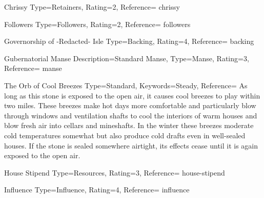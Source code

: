 ﻿


\begin{Merit}{Chrissy}{%
    Type=Retainers,
    Rating=2,
    Reference=\cite*[p.~164]{ex3}
}{chrissy}
    \TBW
\end{Merit}


\begin{Merit}{Followers}{%
    Type=Followers,
    Rating=2,
    Reference=\cite*[p.~161]{ex3}
}{followers}
    \TBW
\end{Merit}


\begin{Merit}{Governorship of -Redacted- Isle}{%
    Type=Backing,
    Rating=4,
    Reference=\cite*[p.~159]{ex3}
}{backing}
    \TBW
\end{Merit}


\begin{Merit}{Gubernatorial Manse}{%
    Description={Standard Manse},
    Type=Manse,
    Rating=3,
    Reference=\cite*[p.~163]{ex3}
}{manse}
    \TBW

    \begin{Hearthstone}{The Orb of Cool Breezes}{%
        Type=Standard,
        Keywords=Steady,
        Reference=\cite*[p.~604]{ex3}
    }
        As long as this stone is exposed to the open air, it causes cool
        breezes to play within two miles. These breezes make hot days more
        comfortable and particularly blow through windows and ventilation
        shafts to cool the interiors of warm houses and blow fresh air into
        cellars and mineshafts. In the winter these breezes moderate cold
        temperatures somewhat but also produce cold drafts even in
        well-sealed houses. If the stone is sealed somewhere airtight, its
        effects cease until it is again exposed to the open air.
    \end{Hearthstone}
\end{Merit}


\DocumentColumnBreak
\begin{Merit}{House Stipend}{%
    Type=Resources,
    Rating=3,
    Reference=\cite*[p.~164]{ex3}
}{house-stipend}
    \TBW
\end{Merit}


\begin{Merit}{Influence}{%
    Type=Influence,
    Rating=4,
    Reference=\cite*[p.~162]{ex3}
}{influence}
    \TBW
\end{Merit}


